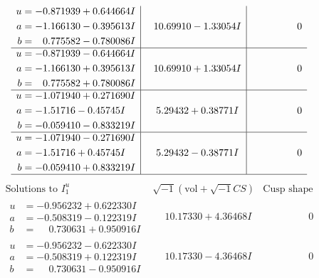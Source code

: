 \documentclass[1p]{elsarticle_modified}
\theoremstyle{definition}
\newcommand{\I}{\sqrt{-1}}
\begin{document}
$$\begin{array}{c|c|c}
\begin{aligned}
u &= -0.871939 + 0.644664 I \\
a &= -1.166130 - 0.395613 I \\
b &= \phantom{-}0.775582 - 0.780086 I\end{aligned}
 & \phantom{-}10.69910 - 1.33054 I & \phantom{-0.000000 } 0 \\ \hline\begin{aligned}
u &= -0.871939 - 0.644664 I \\
a &= -1.166130 + 0.395613 I \\
b &= \phantom{-}0.775582 + 0.780086 I\end{aligned}
 & \phantom{-}10.69910 + 1.33054 I & \phantom{-0.000000 } 0 \\ \hline\begin{aligned}
u &= -1.071940 + 0.271690 I \\
a &= -1.51716 - 0.45745 I \\
b &= -0.059410 - 0.833219 I\end{aligned}
 & \phantom{-}5.29432 + 0.38771 I & \phantom{-0.000000 } 0 \\ \hline\begin{aligned}
u &= -1.071940 - 0.271690 I \\
a &= -1.51716 + 0.45745 I \\
b &= -0.059410 + 0.833219 I\end{aligned}
 & \phantom{-}5.29432 - 0.38771 I & \phantom{-0.000000 } 0\\
 \hline 
 \end{array}$$\newpage$$\begin{array}{c|c|c}  
\text{Solutions to }I^u_{1}& \I (\text{vol} + \sqrt{-1}CS) & \text{Cusp shape}\\
 \hline 
\begin{aligned}
u &= -0.956232 + 0.622330 I \\
a &= -0.508319 - 0.122319 I \\
b &= \phantom{-}0.730631 + 0.950916 I\end{aligned}
 & \phantom{-}10.17330 + 4.36468 I & \phantom{-0.000000 } 0 \\ \hline\begin{aligned}
u &= -0.956232 - 0.622330 I \\
a &= -0.508319 + 0.122319 I \\
b &= \phantom{-}0.730631 - 0.950916 I\end{aligned}
 & \phantom{-}10.17330 - 4.36468 I & \phantom{-0.000000 } 0 \\ \hline\begin{aligned}

\end{aligned}
\end{array}$$
\end{document}
